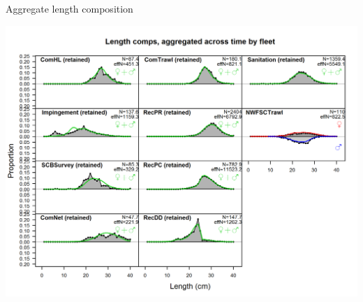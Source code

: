 \documentclass[ignorenonframetext,]{beamer}
\begin{document}
\begin{frame}{Aggregate length composition}

\centering

\includegraphics{r4ss/plots_mod1/comp_lenfit__aggregated_across_time.png}

\end{frame}
\end{document}
